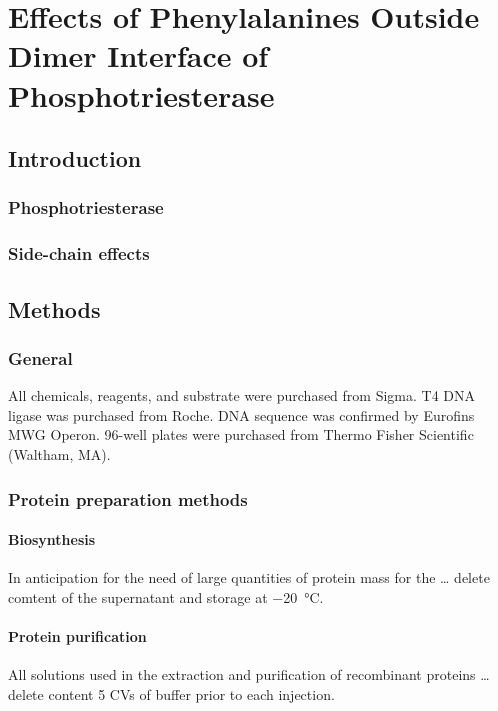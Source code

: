 \chapter{Effects of Phenylalanines Outside Dimer Interface of Phosphotriesterase}
\label{chap:dimer}
\begin{refsection}

\section{Introduction}

\subsection{Phosphotriesterase}

\subsection{Side-chain effects}

\section{Methods}

\subsection{General}

All chemicals, reagents, and substrate were purchased from Sigma. T4 DNA ligase
was purchased from Roche. DNA sequence was confirmed by Eurofins MWG Operon.
96-well plates were purchased from Thermo Fisher Scientific (Waltham, MA).

\subsection{Protein preparation methods}

\subsubsection{Biosynthesis}

In anticipation for the need of large quantities of protein mass for the \ldots
delete comtent of the supernatant and storage at \SI{-20}{\celsius}.

\subsubsection{Protein purification}
All solutions used in the extraction and purification of recombinant proteins
\ldots delete content 5 CVs of buffer prior to each injection.


\end{refsection}
